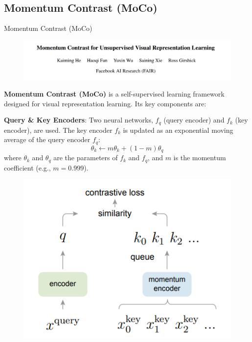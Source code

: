 \subsection{Momentum Contrast (MoCo)}
\begin{frame}[allowframebreaks]{Momentum Contrast (MoCo)}
    \begin{figure}
        \centering
        \includegraphics[width=1\linewidth,height=0.9\textheight,keepaspectratio]{images/ssl/slide_65_1_img.png}
    \end{figure}

    \framebreak

    \textbf{Momentum Contrast (MoCo)} is a self-supervised learning framework designed for visual representation learning. Its key components are:

    \vspace{0.5em}

    \textbf{Query \& Key Encoders}: Two neural networks, $f_q$ (query encoder) and $f_k$ (key encoder), are used. The key encoder $f_k$ is updated as an exponential moving average of the query encoder $f_q$:
        \[
            \theta_k \leftarrow m \theta_k + (1 - m) \theta_q
        \]
        where $\theta_k$ and $\theta_q$ are the parameters of $f_k$ and $f_q$, and $m$ is the momentum coefficient (e.g., $m=0.999$).
    
    \framebreak

    \begin{figure}
        \centering
        \includegraphics[width=1\linewidth,height=0.9\textheight,keepaspectratio]{images/ssl/slide_66_1_img.png}
    \end{figure}


\end{frame}
